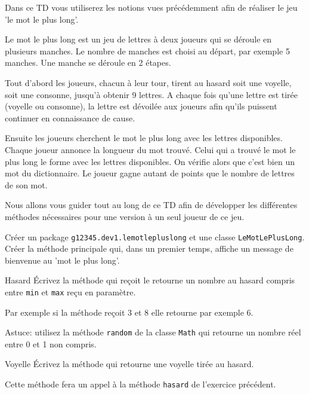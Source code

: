 \documentclass[a4paper,11pt]{article}
\date{2018 -- 2019}
\begin{document}
\entete
\titre
{}
\lastedit

\vspace{0.5cm}

	Dans ce TD vous utiliserez les notions vues précédemment afin de réaliser 
	le jeu 'le mot le plus long'. 
	
	Le mot le plus long est un jeu de lettres à deux joueurs qui se déroule en
	plusieurs manches. Le nombre de manches est choisi au départ, par exemple 5 manches.
	Une manche se déroule en 2 étapes. 
	
	Tout d'abord les joueurs, chacun à leur tour, 
	tirent au hasard soit une voyelle, soit une consonne, 
	jusqu'à obtenir 9 lettres. A chaque fois qu'une lettre est tirée 
	(voyelle ou consonne), la lettre est dévoilée aux joueurs afin qu'ils puissent
	continuer en connaissance de cause.

	Ensuite les joueurs cherchent le mot le plus long avec les lettres disponibles.
	Chaque joueur annonce la longueur du mot trouvé. Celui qui a trouvé le mot le 
	plus long le forme avec les lettres disponibles. On vérifie alors que c'est 
	bien un mot du dictionnaire. Le joueur gagne autant de points que le nombre
	de lettres de son mot. 
			

\vspace{0.5cm}


Nous allons vous guider tout au long de ce TD afin de développer les différentes méthodes nécessaires pour une version à un seul joueur de ce jeu.



		Créer un package \texttt{g12345.dev1.lemotlepluslong} et une classe
		 \texttt{LeMotLePlusLong}. Créer la méthode principale qui, dans un premier 
		temps, affiche un message de bienvenue au 'mot le plus long'.


 	\begin{Exercice}{Hasard}
		\'Ecrivez la méthode  qui reçoit le
		retourne un nombre au hasard compris entre \texttt{min} et \texttt{max} 
		reçu en paramètre.
		
		Par exemple si la méthode reçoit 3 et 8 elle retourne par exemple 6.
		
		Astuce: utilisez la méthode \texttt{random} de la classe \texttt{Math} qui 
		retourne un nombre réel entre 0 et 1 non compris.
	\end{Exercice} 

 
 	\begin{Exercice}{Voyelle}
		\'Ecrivez la méthode  qui retourne une voyelle 
		tirée au hasard.
		
		Cette méthode fera un appel à la méthode \texttt{hasard} 
		de l'exercice précédent.
	\end{Exercice} 
\end{document}
